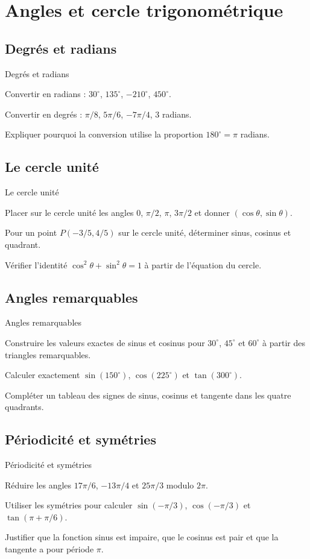 \chapter{Angles et cercle trigonométrique}
\label{workbook:chapter:14}
\section{Degrés et radians}
\label{workbook:section:14.01}
\begin{exerciseblock}{Degrés et radians}
\item Convertir en radians : $30^\circ$, $135^\circ$, $-210^\circ$, $450^\circ$.
\item Convertir en degrés : $\pi/8$, $5\pi/6$, $-7\pi/4$, $3$ radians.
\item Expliquer pourquoi la conversion utilise la proportion $180^\circ=\pi$ radians.
\end{exerciseblock}
\section{Le cercle unité}
\label{workbook:section:14.02}
\begin{exerciseblock}{Le cercle unité}
\item Placer sur le cercle unité les angles $0$, $\pi/2$, $\pi$, $3\pi/2$ et donner $(\cos\theta,\sin\theta)$.
\item Pour un point $P(-3/5,4/5)$ sur le cercle unité, déterminer sinus, cosinus et quadrant.
\item Vérifier l'identité $\cos^2\theta+\sin^2\theta=1$ à partir de l'équation du cercle.
\end{exerciseblock}
\section{Angles remarquables}
\label{workbook:section:14.03}
\begin{exerciseblock}{Angles remarquables}
\item Construire les valeurs exactes de sinus et cosinus pour $30^\circ$, $45^\circ$ et $60^\circ$ à partir des triangles remarquables.
\item Calculer exactement $\sin(150^\circ)$, $\cos(225^\circ)$ et $\tan(300^\circ)$.
\item Compléter un tableau des signes de sinus, cosinus et tangente dans les quatre quadrants.
\end{exerciseblock}
\section{Périodicité et symétries}
\label{workbook:section:14.04}
\begin{exerciseblock}{Périodicité et symétries}
\item Réduire les angles $17\pi/6$, $-13\pi/4$ et $25\pi/3$ modulo $2\pi$.
\item Utiliser les symétries pour calculer $\sin(-\pi/3)$, $\cos(-\pi/3)$ et $\tan(\pi+\pi/6)$.
\item Justifier que la fonction sinus est impaire, que le cosinus est pair et que la tangente a pour période $\pi$.
\end{exerciseblock}

